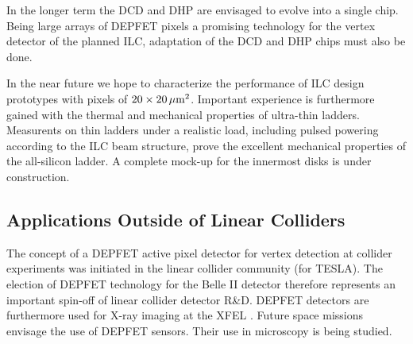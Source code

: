 In the longer term the DCD and DHP are envisaged to evolve into a single chip. Being large arrays of DEPFET pixels a promising technology for the vertex detector of the planned ILC, adaptation of the DCD and DHP chips must also be done.

 In the near future we hope to characterize the performance of ILC design prototypes with pixels of $20 \times \unit[20]{\micron^2}$.
Important experience is furthermore gained with the thermal and mechanical properties of ultra-thin ladders. Measurents on thin ladders under a realistic load, including pulsed powering according to the ILC beam structure, prove the excellent mechanical properties of the all-silicon ladder. A complete mock-up for the innermost disks is under construction.

\subsection{Applications Outside of Linear Colliders}
The concept of a DEPFET active pixel detector for vertex detection at collider experiments was initiated in the linear collider community (for TESLA). The election of DEPFET technology for the Belle II detector therefore represents an important spin-off of linear collider detector R\&D. DEPFET detectors are furthermore used for X-ray imaging at the XFEL . Future space missions envisage the use of DEPFET sensors. Their use in microscopy is being studied.
